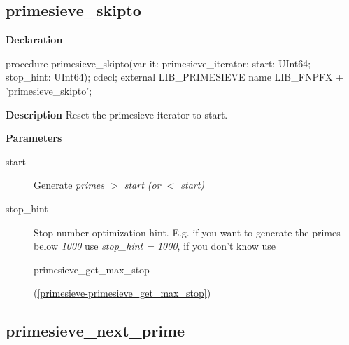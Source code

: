 \documentclass{report}
\newif\ifpdf
\begin{document}
\subsection*{primesieve{\_}skipto}
\fi
\label{primesieve-primesieve_skipto}
\begin{list}{}{
\setlength{\itemindent}{0cm}
\setlength{\listparindent}{0cm}
\setlength{\leftmargin}{\evensidemargin}
\addtolength{\leftmargin}{\tmplength}
\settowidth{\labelsep}{X}
\addtolength{\leftmargin}{\labelsep}
\setlength{\labelwidth}{\tmplength}
}
\item[\textbf{Declaration}\hfill]
\ifpdf
\begin{flushleft}
\fi
\begin{ttfamily}
procedure primesieve{\_}skipto(var it: primesieve{\_}iterator; start: UInt64; stop{\_}hint: UInt64); cdecl; external LIB{\_}PRIMESIEVE name LIB{\_}FNPFX + 'primesieve{\_}skipto';\end{ttfamily}

\ifpdf
\end{flushleft}
\fi

\par
\item[\textbf{Description}]
Reset the primesieve iterator to start.



\par
\item[\textbf{Parameters}]
\begin{description}
\item[start] Generate \textit{primes {$>$} start (or {$<$} start)}
\item[stop{\_}hint] Stop number optimization hint. E.g. if you want to generate the primes below \textit{1000} use \textit{stop{\_}hint = 1000}, if you don't know use \begin{ttfamily}primesieve{\_}get{\_}max{\_}stop\end{ttfamily}(\ref{primesieve-primesieve_get_max_stop})
\end{description}


\end{list}
\ifpdf
\subsection*{\large{\textbf{primesieve{\_}next{\_}prime}}\normalsize\hspace{1ex}\hrulefill}
\else
\end{document}
